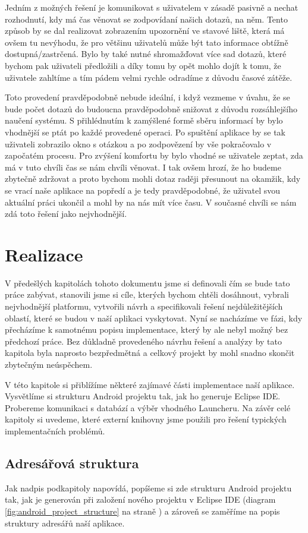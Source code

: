 \documentclass[thesis=M,czech]{FITthesis}[2012/06/26]
\begin{document}
Jedním z možných řešení je komunikovat s uživatelem v zásadě pasivně a nechat rozhodnutí, kdy má čas věnovat se zodpovídaní našich dotazů, na něm. Tento způsob by se dal realizovat zobrazením upozornění ve stavové liště, která má ovšem tu nevýhodu, že pro většinu uživatelů může být tato informace obtížně dostupná/zastrčená. Bylo by také nutné shromažďovat více sad dotazů, které bychom pak uživateli předložili a díky tomu by opět mohlo dojít k tomu, že uživatele zahltíme a tím pádem velmi rychle odradíme z důvodu časové zátěže.

Toto provedení pravděpodobně nebude ideální, i když vezmeme v úvahu, že se bude počet dotazů do budoucna pravděpodobně snižovat z důvodu rozsáhlejšího naučení systému. S přihlédnutím k zamýšlené formě sběru informací by bylo vhodnější se ptát po každé provedené operaci. Po spuštění aplikace by se tak uživateli zobrazilo okno s otázkou a po zodpovězení by vše pokračovalo v započatém procesu. Pro zvýšení komfortu by bylo vhodné se uživatele zeptat, zda má v tuto chvíli čas se nám chvíli věnovat. I tak ovšem hrozí, že ho budeme zbytečně zdržovat a proto bychom mohli dotaz raději přesunout na okamžik, kdy se vrací naše aplikace na popředí a je tedy pravděpodobné, že uživatel svou aktuální práci ukončil a mohl by na nás mít více času. V současné chvíli se nám zdá toto řešení jako nejvhodnější.

\chapter{Realizace}
V předešlých kapitolách tohoto dokumentu jsme si definovali čím se bude tato práce zabývat, stanovili jsme si cíle, kterých bychom chtěli dosáhnout, vybrali nejvhodnější platformu, vytvořili návrh a specifikovali řešení nejdůležitějších oblastí, které se budou v naší aplikaci vyskytovat. Nyní se nacházíme ve fázi, kdy přecházíme k samotnému popisu implementace, který by ale nebyl možný bez předchozí práce. Bez důkladně provedeného návrhu řešení a analýzy by tato kapitola byla naprosto bezpředmětná a celkový projekt by mohl snadno skončit zbytečným neúspěchem. 

V této kapitole si přiblížíme některé zajímavé části implementace naší aplikace. Vysvětlíme si strukturu Android projektu tak, jak ho generuje Eclipse IDE. Probereme komunikaci s databází a výběr vhodného Launcheru. Na závěr celé kapitoly si uvedeme, které externí knihovny jsme použili pro řešení typických implementačních problémů.

\section{Adresářová struktura}
Jak nadpis podkapitoly napovídá, popíšeme si zde strukturu Android projektu \cite{android_project_structure} tak, jak je generován při založení nového projektu v Eclipse IDE (diagram \ref{fig:android_project_structure} na straně \pageref{fig:android_project_structure}) a zároveň se zaměříme na popis struktury adresářů naší aplikace.
\end{document}
